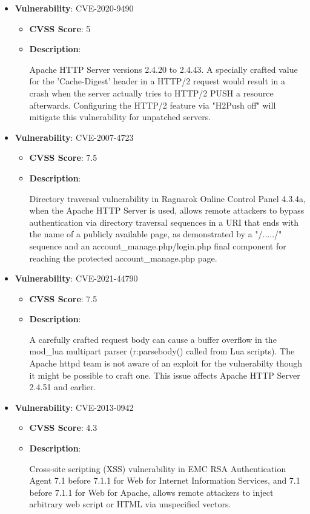 \documentclass{article}
\begin{document}
\begin{itemize}
        \item \textbf{Vulnerability}: CVE-2020-9490
        \begin{itemize}
            \item \textbf{CVSS Score}:  5 
            \item \textbf{Description}:
            \parbox[t]{0.9\linewidth}{
                \ttfamily Apache HTTP Server versions 2.4.20 to 2.4.43. A specially crafted value for the 'Cache-Digest' header in a HTTP/2 request would result in a crash when the server actually tries to HTTP/2 PUSH a resource afterwards. Configuring the HTTP/2 feature via "H2Push off" will mitigate this vulnerability for unpatched servers.
            }
        \end{itemize}
    
        \item \textbf{Vulnerability}: CVE-2007-4723
        \begin{itemize}
            \item \textbf{CVSS Score}:  7.5 
            \item \textbf{Description}:
            \parbox[t]{0.9\linewidth}{
                \ttfamily Directory traversal vulnerability in Ragnarok Online Control Panel 4.3.4a, when the Apache HTTP Server is used, allows remote attackers to bypass authentication via directory traversal sequences in a URI that ends with the name of a publicly available page, as demonstrated by a "/...../" sequence and an account\_manage.php/login.php final component for reaching the protected account\_manage.php page.
            }
        \end{itemize}
    
        \item \textbf{Vulnerability}: CVE-2021-44790
        \begin{itemize}
            \item \textbf{CVSS Score}:  7.5 
            \item \textbf{Description}:
            \parbox[t]{0.9\linewidth}{
                \ttfamily A carefully crafted request body can cause a buffer overflow in the mod\_lua multipart parser (r:parsebody() called from Lua scripts). The Apache httpd team is not aware of an exploit for the vulnerabilty though it might be possible to craft one. This issue affects Apache HTTP Server 2.4.51 and earlier.
            }
        \end{itemize}
    
        \item \textbf{Vulnerability}: CVE-2013-0942
        \begin{itemize}
            \item \textbf{CVSS Score}:  4.3 
            \item \textbf{Description}:
            \parbox[t]{0.9\linewidth}{
                \ttfamily Cross-site scripting (XSS) vulnerability in EMC RSA Authentication Agent 7.1 before 7.1.1 for Web for Internet Information Services, and 7.1 before 7.1.1 for Web for Apache, allows remote attackers to inject arbitrary web script or HTML via unspecified vectors.
            }
        \end{itemize}
    

\end{itemize}
\end{document}
